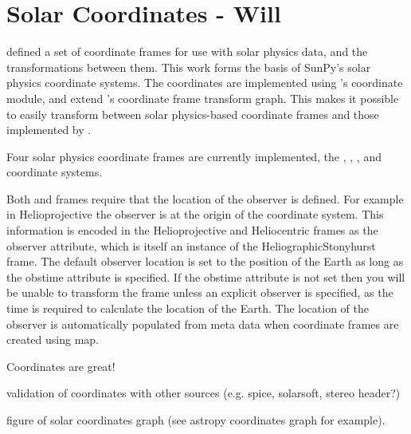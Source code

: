 \section{Solar Coordinates - Will}
\label{sec:coords}
\cite{2006A&A...449..791T} defined a set of coordinate frames for use with solar physics data, and the transformations between them.  This work forms the basis of SunPy's solar physics coordinate systems.  The coordinates are implemented using \astropy's coordinate module, and extend \astropy's coordinate frame transform graph.  This makes it possible to easily transform between \sunpy solar physics-based coordinate frames and those implemented by \astropy.

Four solar physics coordinate frames are currently implemented, the \hpc, \hcc, \hgs, and \hgc coordinate systems.

Both \hpc and \hcc frames require that the location of the observer is defined. For example in Helioprojective the observer is at the origin of the coordinate system. This information is encoded in the Helioprojective and Heliocentric frames as the observer attribute, which is itself an instance of the HeliographicStonyhurst frame. The default observer location is set to the position of the Earth as long as the obstime attribute is specified. If the obstime attribute is not set then you will be unable to transform the frame unless an explicit observer is specified, as the time is required to calculate the location of the Earth. The location of the observer is automatically populated from meta data when coordinate frames are created using map.

Coordinates are great!

validation of coordinates with other sources (e.g. spice, solarsoft, stereo header?)

figure of solar coordinates graph (see astropy coordinates graph for example).


